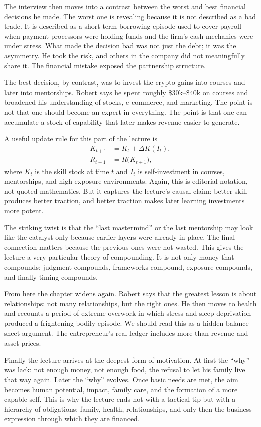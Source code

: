 The interview then moves into a contrast between the worst and best financial decisions he made. The worst one is revealing because it is not described as a bad trade. It is described as a short-term borrowing episode used to cover payroll when payment processors were holding funds and the firm's cash mechanics were under stress. What made the decision bad was not just the debt; it was the asymmetry. He took the risk, and others in the company did not meaningfully share it. The financial mistake exposed the partnership structure.

The best decision, by contrast, was to invest the crypto gains into courses and later into mentorships. Robert says he spent roughly \$30k--\$40k on courses and broadened his understanding of stocks, e-commerce, and marketing. The point is not that one should become an expert in everything. The point is that one can accumulate a stock of capability that later makes revenue easier to generate.

A useful update rule for this part of the lecture is
\begin{align}
K_{t+1} &= K_t + \Delta K(I_t),\\
R_{t+1} &= R\bigl(K_{t+1}\bigr),
\end{align}
where \(K_t\) is the skill stock at time \(t\) and \(I_t\) is self-investment in courses, mentorships, and high-exposure environments. Again, this is editorial notation, not quoted mathematics. But it captures the lecture's causal claim: better skill produces better traction, and better traction makes later learning investments more potent.

The striking twist is that the ``last mastermind'' or the last mentorship may look like the catalyst only because earlier layers were already in place. The final connection matters because the previous ones were not wasted. This gives the lecture a very particular theory of compounding. It is not only money that compounds; judgment compounds, frameworks compound, exposure compounds, and finally timing compounds.

From here the chapter widens again. Robert says that the greatest lesson is about relationships: not many relationships, but the right ones. He then moves to health and recounts a period of extreme overwork in which stress and sleep deprivation produced a frightening bodily episode. We should read this as a hidden-balance-sheet argument. The entrepreneur's real ledger includes more than revenue and asset prices.

Finally the lecture arrives at the deepest form of motivation. At first the ``why'' was lack: not enough money, not enough food, the refusal to let his family live that way again. Later the ``why'' evolves. Once basic needs are met, the aim becomes human potential, impact, family care, and the formation of a more capable self. This is why the lecture ends not with a tactical tip but with a hierarchy of obligations: family, health, relationships, and only then the business expression through which they are financed.

